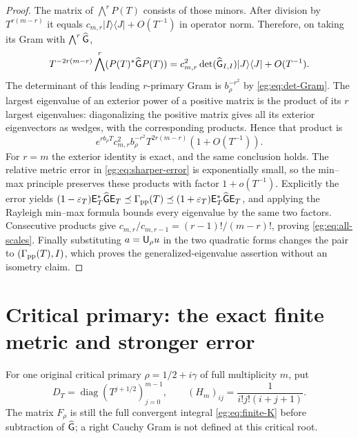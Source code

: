 \begin{proof}
The matrix of $\bigwedge^rP(T)$ consists of those minors. After
division by $T^{r(m-r)}$ it equals
$c_{m,r}|I\rangle\langle J|+O(T^{-1})$ in operator norm.
Therefore, on taking its Gram with $\bigwedge^r\widehat{\mathsf G}$,
\[
 T^{-2r(m-r)}\bigwedge^r(P(T)^*\widehat{\mathsf G} P(T))
 =c_{m,r}^2\det(\widehat{\mathsf G}_{I,I})|J\rangle\langle J|+O(T^{-1}).
\]
The determinant of this leading $r$-primary Gram is $b_\rho^{-r^2}$
by \eqref{eg:eq:det-Gram}. The largest eigenvalue of an exterior power
of a positive matrix is the product of its $r$ largest eigenvalues:
diagonalizing the positive matrix gives all its exterior eigenvectors
as wedges, with the corresponding products. Hence that product is
\[
 e^{rb_\rho T}c_{m,r}^2b_\rho^{-r^2}T^{2r(m-r)}(1+O(T^{-1})).
\]
For $r=m$ the exterior identity is exact, and the same conclusion
holds. The relative metric error in \eqref{eg:eq:sharper-error} is
exponentially small, so the min--max principle preserves these
products with factor $1+o(T^{-1})$. Explicitly the error yields
$(1-\varepsilon_T)\mathsf E_T^*\widehat{\mathsf G}\mathsf E_T\preceq\Gamma_{\rm pp}(T)
\preceq(1+\varepsilon_T)\mathsf E_T^*\widehat{\mathsf G}\mathsf E_T$, and applying
the Rayleigh min--max formula bounds every eigenvalue by the same
two factors. Consecutive products give
$c_{m,r}/c_{m,r-1}=(r-1)!/(m-r)!$, proving \eqref{eg:eq:all-scales}.
Finally substituting $a=\mathsf U_\rho u$ in the two quadratic forms
changes the pair to $(\Gamma_{\rm pp}(T),I)$, which proves the
generalized-eigenvalue assertion without an isometry claim.
\end{proof}

\section{Critical primary: the exact finite metric and stronger error}\label{eg:sec:critical}
For one original critical primary $\rho=1/2+i\gamma$ of full
multiplicity $m$, put
\[
 D_T=\operatorname{diag}(T^{j+1/2})_{j=0}^{m-1},\qquad
 (H_m)_{ij}=\frac1{i!j!(i+j+1)}.
 \tag{EG44}\label{eg:eq:critical-H}
\]
The matrix $F_\rho$ is still the full convergent integral
\eqref{eg:eq:finite-K} before subtraction of $\widehat{\mathsf G}$; a right
Cauchy Gram is not defined at this critical root.

